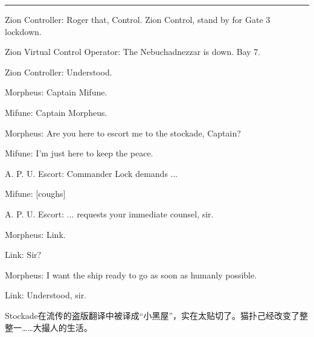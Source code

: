 \documentclass[UTF8]{ctexart}
\newcommand{\myparsep}{\noindent \rule[0.5ex]{\linewidth}{1pt}}
\newenvironment{myquote}{\color{green} \setlength{\leftskip}{6em} \setlength{\rightskip}{4em} \setlength{\parindent}{-2em}}{\par}
\begin{document}
\myparsep

\begin{myquote}
Zion Controller: Roger that, Control. Zion Control, stand by for Gate 3 lockdown.

Zion Virtual Control Operator: The Nebuchadnezzar is down. Bay 7.

Zion Controller: Understood.

Morpheus: Captain Mifune.

Mifune: Captain Morpheus.

Morpheus: Are you here to escort me to the stockade, Captain?

Mifune: I'm just here to keep the peace.

A. P. U. Escort: Commander Lock demands ...

Mifune: [coughs]

A. P. U. Escort: ... requests your immediate counsel, sir.

Morpheus: Link.

Link: Sir?

Morpheus: I want the ship ready to go as soon as humanly possible.

Link: Understood, sir.
\end{myquote}

Stockade在流传的盗版翻译中被译成“小黑屋”，实在太贴切了。猫扑己经改变了整整一……大撮人的生活。
\end{document}
